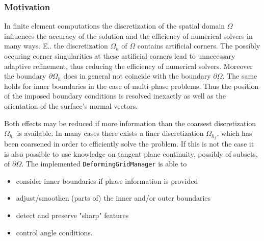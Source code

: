 \documentclass[11pt]{article}
\begin{document}
\subsubsection{Motivation}
In finite element computations the discretization of the spatial domain
$\Omega$ influences the accuracy of the solution and the efficiency
of numerical solvers in many ways. E.. the discretization $\Omega_{h}$
of $\Omega$ contains artificial corners. The possibly
occuring corner singularities at these artificial corners lead to
unnecessary adaptive refinement, thus reducing the efficiency of numerical
solvers. Moreover the boundary $\partial\Omega_{h}$ does in general
not coincide with the boundary $\partial\Omega$. The same holds for
inner boundaries in the case of multi-phase problems. Thus the position
of the imposed boundary conditions is resolved inexactly as well as
the orientation of the surface's normal vectors.

Both effects may be reduced if more information than the coarsest
discretization $\Omega_{h_{c}}$ is available. In many cases there
exists a finer discretization $\Omega_{h_{f}}$, which has been coarsened
in order to efficiently solve the problem. If this is not the case
it is also possible to use knowledge on tangent plane continuity,
possibly of subsets, of $\partial\Omega$. The implemented 
\verb+DeformingGridManager+ is able to 
\begin{itemize}
\item consider inner boundaries if phase information is provided
\item adjust/smoothen (parts of) the inner and/or outer boundaries
\item detect and preserve "sharp" features
\item control angle conditions.
\end{itemize}
\end{document}

